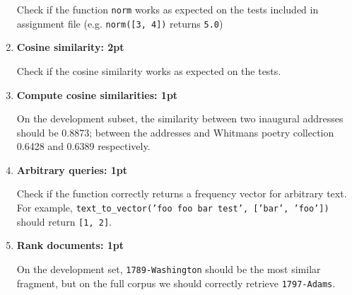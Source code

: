 \documentclass[11pt, a4paper]{article}
\begin{document}
\begin{enumerate}
  Check if the function \texttt{norm} works as expected on the tests included in assignment file (e.g. \texttt{norm([3, 4])} returns \texttt{5.0})
  
  \item \textbf{Cosine similarity: 2pt}
  
  Check if the cosine similarity works as expected on the tests.
  
  \item \textbf{Compute cosine similarities: 1pt}
  
  On the development subset, the similarity between two inaugural addresses should be 0.8873; between the addresses and Whitmans poetry collection 0.6428 and 0.6389 respectively.
  
  \item \textbf{Arbitrary queries: 1pt}

  Check if the function correctly returns a frequency vector for arbitrary text. For example, \texttt{text\_to\_vector('foo foo bar test', ['bar', 'foo'])} should return \texttt{[1, 2]}.
  
  \item \textbf{Rank documents: 1pt}
  
  On the development set, \texttt{1789-Washington} should be the most similar fragment, but on the full corpus we should correctly retrieve \texttt{1797-Adams}.
\end{enumerate}
\end{document}
